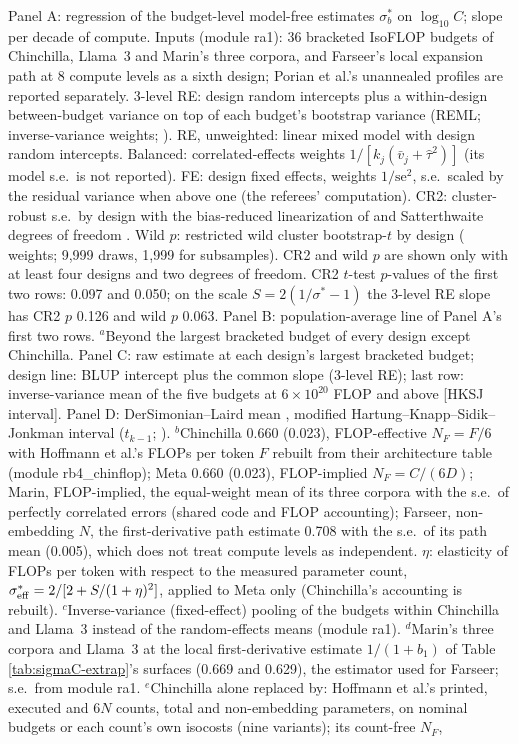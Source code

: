 \begin{table}[tp]
\begin{tablenotes}
Panel A: regression of the budget-level model-free estimates $\sigma^*_b$ on $\log_{10}C$; slope per decade of compute. Inputs (module ra1): 36 bracketed IsoFLOP budgets of Chinchilla, Llama~3 and Marin's three corpora, and Farseer's local expansion path at 8 compute levels as a sixth design; Porian et al.'s unannealed profiles are reported separately. 3-level RE: design random intercepts plus a within-design between-budget variance on top of each budget's bootstrap variance (REML; inverse-variance weights; \citealt{konstantopoulos2011fixed}). RE, unweighted: linear mixed model with design random intercepts. Balanced: correlated-effects weights $1/[k_j(\bar v_j+\hat\tau^2)]$ \citep{hedges2010robust} (its model s.e.\ is not reported). FE: design fixed effects, weights $1/\mathrm{se}^2$, s.e.\ scaled by the residual variance when above one (the referees' computation). CR2: cluster-robust s.e.\ by design with the bias-reduced linearization of \citet{bell2002bias} and Satterthwaite degrees of freedom \citep{pustejovsky2018small,tipton2015small}. Wild $p$: restricted wild cluster bootstrap-$t$ by design (\citealt{webb2023reworking} weights; 9,999 draws, 1,999 for subsamples). CR2 and wild $p$ are shown only with at least four designs and two degrees of freedom. CR2 $t$-test $p$-values of the first two rows: 0.097 and 0.050; on the scale $S=2(1/\sigma^*-1)$ the 3-level RE slope has CR2 $p$ 0.126 and wild $p$ 0.063. Panel B: population-average line of Panel A's first two rows. $^{a}$Beyond the largest bracketed budget of every design except Chinchilla. Panel C: raw estimate at each design's largest bracketed budget; design line: BLUP intercept plus the common slope (3-level RE); last row: inverse-variance mean of the five budgets at $6\times10^{20}$ FLOP and above [HKSJ interval]. Panel D: DerSimonian--Laird mean \citep{dersimonian1986meta}, modified Hartung--Knapp--Sidik--Jonkman interval ($t_{k-1}$; \citealt{hartung2001tests,sidik2002simple}). $^{b}$Chinchilla 0.660 (0.023), FLOP-effective $N_F=F/6$ with Hoffmann et al.'s FLOPs per token $F$ rebuilt from their architecture table (module rb4\_chinflop); Meta 0.660 (0.023), FLOP-implied $N_F=C/(6D)$; Marin, FLOP-implied, the equal-weight mean of its three corpora with the s.e.\ of perfectly correlated errors (shared code and FLOP accounting); Farseer, non-embedding $N$, the first-derivative path estimate 0.708 with the s.e.\ of its path mean (0.005), which does not treat compute levels as independent. $\eta$: elasticity of FLOPs per token with respect to the measured parameter count, $\sigma^*_{\rm eff}=2/[2+S/(1+\eta)^2]$, applied to Meta only (Chinchilla's accounting is rebuilt). $^{c}$Inverse-variance (fixed-effect) pooling of the budgets within Chinchilla and Llama~3 instead of the random-effects means (module ra1). $^{d}$Marin's three corpora and Llama~3 at the local first-derivative estimate $1/(1+b_1)$ of Table \ref{tab:sigmaC-extrap}'s surfaces (0.669 and 0.629), the estimator used for Farseer; s.e.\ from module ra1. $^{e}$Chinchilla alone replaced by: Hoffmann et al.'s printed, executed and 6$N$ counts, total and non-embedding parameters, on nominal budgets or each count's own isocosts (nine variants); its count-free $N_F$, 
\end{tablenotes}
\end{table}
